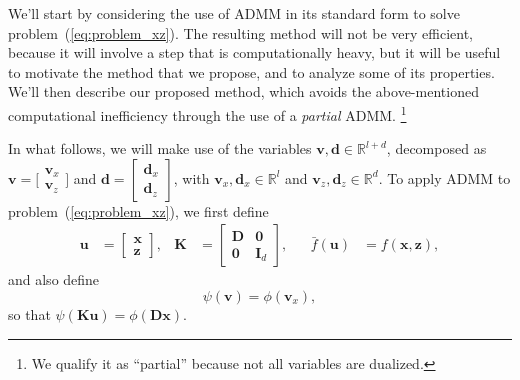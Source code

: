 \documentclass[10pt,twocolumn,twoside]{IEEEtran}
\newcommand{\x}{\mathbf{x}} %
\newcommand{\z}{\mathbf{z}} %
\newcommand{\vs}{\mathbf{v}} %
\newcommand{\dv}{\mathbf{d}} %
\newcommand{\D}{\mathbf{D}} %
\newcommand{\I}{\mathbf{I}} %
\newcommand{\K}{\mathbf{K}} %
\newcommand{\uu}{\mathbf{u}} %
\begin{document}
We'll start by considering the use of ADMM in its standard form to solve problem~(\ref{eq:problem_xz}). The resulting method will not be very efficient, because it will involve a step that is computationally heavy, but it will be useful to motivate the method that we propose, and to analyze some of its properties. We'll then describe our proposed method, which avoids the above-mentioned computational inefficiency through the use of a \emph{partial} ADMM.%
\footnote{We qualify it as ``partial'' because not all variables are dualized.}

In what follows, we will make use of the variables $\vs, \dv \in \mathbb R^{l+d}$, decomposed as $\vs = \big[ \begin{smallmatrix} \vs_x \\ \vs_z \end{smallmatrix} \big]$ and $\dv = \left[\begin{smallmatrix}\dv_x\\ \dv_z \end{smallmatrix}\right]$, with $\vs_x, \dv_x \in \mathbb R^l$ and $\vs_z, \dv_z \in \mathbb R^d$.  To apply ADMM to problem~(\ref{eq:problem_xz}), we first define
\[
\begin{aligned}
\uu &= \begin{bmatrix}
  \x \\
  \z
\end{bmatrix},
&
\K &= \begin{bmatrix}
  \D & \mathbf{0} \\
  \mathbf{0} & \I_{d}
\end{bmatrix},
&
&\bar f(\uu) &= f(\x,\z),
\end{aligned}
\]
and also define
\begin{equation*}
	\psi(\vs) = \phi(\vs_x),
\end{equation*}
so that $\psi(\K \uu) = \phi(\D \x)$.
\end{document}
